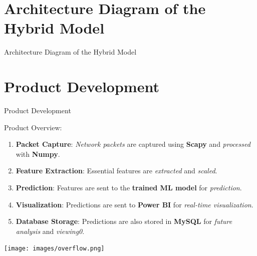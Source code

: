 \documentclass{beamer}
\begin{document}
\section{Architecture Diagram of the Hybrid Model}

\begin{frame}{Architecture Diagram of the Hybrid Model}
\end{frame}

\section{Product Development}
\begin{frame}{Product Development}
\begin{minipage}{0.6\textwidth}
    Product Overview:
    \begin{enumerate}
        \item \textbf{Packet Capture}: \textit{Network packets} are captured using \textbf{Scapy} and \textit{processed} with \textbf{Numpy}.
        \item \textbf{Feature Extraction}: Essential features are \textit{extracted} and \textit{scaled}.
        \item \textbf{Prediction}: Features are sent to the \textbf{trained ML model} for \textit{prediction}.
        \item \textbf{Visualization}: Predictions are sent to \textbf{Power BI} for \textit{real-time visualization}.
        \item \textbf{Database Storage}: Predictions are also stored in \textbf{MySQL} for \textit{future analysis} and \textit{viewing0}.
    \end{enumerate}
\end{minipage}%
\begin{minipage}{0.4\textwidth}
\texttt{[image: images/overflow.png]}
\end{minipage}
\end{frame}
\end{document}
